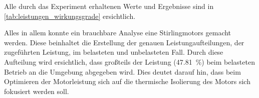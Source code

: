 \documentclass[11pt]{scrartcl}
\begin{document}
Alle durch das Experiment erhaltenen Werte und Ergebnisse sind in
\autoref{tab:leistungen_wirkungsgrade} ersichtlich. 

Alles in allem konnte ein brauchbare Analyse eine Stirlingmotors gemacht
werden. Diese beinhaltet die Erstellung der genauen Leistungaufteilungen, der
zugeführten Leistung, im belasteten und unbelasteten Fall. Durch diese
Aufteilung wird ersichtlich, dass großteils der Leistung (\SI{47.81}{\percent})
beim belasteten Betrieb an die Umgebung abgegeben wird. Dies deutet
darauf hin, dass beim Optimieren der Motorleistung sich auf die 
thermische Isolierung des Motors sich fokusiert werden soll.

\newpage
\printbibliography

\listoffigures

\listoftables
\end{document}
